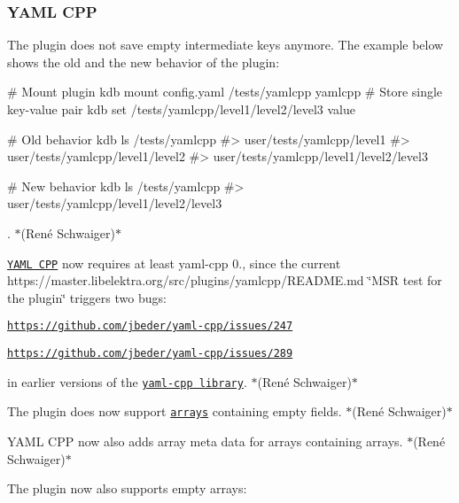 \subsubsection*{Y\+A\+ML C\+PP}


\begin{DoxyItemize}
\item The plugin does not save empty intermediate keys anymore. The example below shows the old and the new behavior of the plugin\+:
\end{DoxyItemize}


\begin{DoxyCode}
# Mount plugin
kdb mount config.yaml /tests/yamlcpp yamlcpp
# Store single key-value pair
kdb set /tests/yamlcpp/level1/level2/level3 value

# Old behavior
kdb ls /tests/yamlcpp
#> user/tests/yamlcpp/level1
#> user/tests/yamlcpp/level1/level2
#> user/tests/yamlcpp/level1/level2/level3

# New behavior
kdb ls /tests/yamlcpp
#> user/tests/yamlcpp/level1/level2/level3
\end{DoxyCode}
 . $\ast$(René Schwaiger)$\ast$


\begin{DoxyItemize}
\item \href{http://libelektra.org/plugins/yamlcpp}{\tt Y\+A\+ML C\+PP} now requires at least {\ttfamily yaml-\/cpp 0.}, since the current https\+://master.libelektra.\+org/src/plugins/yamlcpp/\+R\+E\+A\+D\+ME.md \char`\"{}\+M\+S\+R test for the plugin\char`\"{} triggers two bugs\+:
\begin{DoxyItemize}
\item \href{https://github.com/jbeder/yaml-cpp/issues/247}{\tt https\+://github.\+com/jbeder/yaml-\/cpp/issues/247}
\item \href{https://github.com/jbeder/yaml-cpp/issues/289}{\tt https\+://github.\+com/jbeder/yaml-\/cpp/issues/289}
\end{DoxyItemize}

in earlier versions of the \href{https://github.com/jbeder/yaml-cpp}{\tt yaml-\/cpp library}. $\ast$(René Schwaiger)$\ast$
\item The plugin does now support \href{https://www.libelektra.org/tutorials/arrays}{\tt arrays} containing empty fields. $\ast$(René Schwaiger)$\ast$
\item Y\+A\+ML C\+PP now also adds {\ttfamily array} meta data for arrays containing arrays. $\ast$(René Schwaiger)$\ast$
\item The plugin now also supports empty arrays\+:
\end{DoxyItemize}


